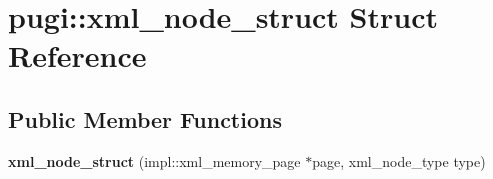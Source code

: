 \hypertarget{structpugi_1_1xml__node__struct}{}\section{pugi\+:\+:xml\+\_\+node\+\_\+struct Struct Reference}
\label{structpugi_1_1xml__node__struct}
\subsection*{Public Member Functions}
\begin{DoxyCompactItemize}
\item 
\mbox{\label{structpugi_1_1xml__node__struct_af9af20f835af8b6b99f9a39c93920ea6}} 
{\bfseries xml\+\_\+node\+\_\+struct} (impl\+::xml\+\_\+memory\+\_\+page $\ast$page, xml\+\_\+node\+\_\+type type)
\end{DoxyCompactItemize}
